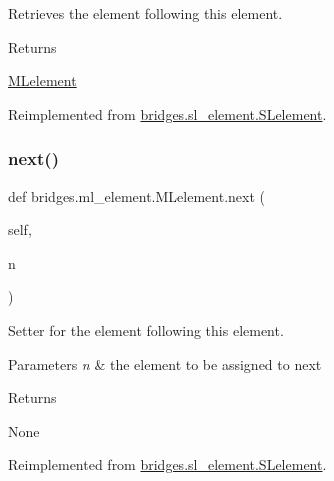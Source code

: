 Retrieves the element following this element. 

\begin{DoxyReturn}{Returns}


\mbox{\hyperlink{classbridges_1_1ml__element_1_1_m_lelement}{M\+Lelement}} 
\end{DoxyReturn}


Reimplemented from \mbox{\hyperlink{classbridges_1_1sl__element_1_1_s_lelement_acef793fc5e2533fb91795d01904e8b6d}{bridges.\+sl\+\_\+element.\+S\+Lelement}}.

\mbox{\label{classbridges_1_1ml__element_1_1_m_lelement_a588b700bb42eb43ce3993f9715497deb}} 
\subsubsection{\texorpdfstring{next()}{next()}\hspace{0.1cm}{\footnotesize\ttfamily [2/2]}}
{\footnotesize\ttfamily def bridges.\+ml\+\_\+element.\+M\+Lelement.\+next (\begin{DoxyParamCaption}\item[{}]{self,  }\item[{}]{n }\end{DoxyParamCaption})}



Setter for the element following this element. 


\begin{DoxyParams}{Parameters}
{\em n} & the element to be assigned to next \\
\hline
\end{DoxyParams}
\begin{DoxyReturn}{Returns}


None 
\end{DoxyReturn}


Reimplemented from \mbox{\hyperlink{classbridges_1_1sl__element_1_1_s_lelement_a210373939597f4c3bcc26fff98b4e44f}{bridges.\+sl\+\_\+element.\+S\+Lelement}}.

\mbox{\label{classbridges_1_1ml__element_1_1_m_lelement_a1b02783280dacd20982bb06a1e3070f4}} 
